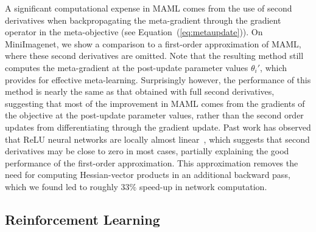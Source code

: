 \documentclass{article}
\begin{document}
A significant computational expense in MAML comes from the use of second derivatives when backpropagating the meta-gradient through the gradient operator in the meta-objective (see Equation~(\ref{eq:metaupdate})). On MiniImagenet, we show a comparison to a first-order approximation of MAML, where these second derivatives are omitted. Note that the resulting method still computes the meta-gradient at the post-update parameter values $\theta_i'$, which provides for effective meta-learning. Surprisingly however, the performance of this method is nearly the same as that obtained with full second derivatives, suggesting that most of the improvement in MAML comes from the gradients of the objective at the post-update parameter values, rather than the second order updates from differentiating through the gradient update. Past work has observed that ReLU neural networks are locally almost linear~\citep{linear}, which suggests that second derivatives may be close to zero in most cases, partially explaining the good performance of the first-order approximation. This approximation removes the need for computing Hessian-vector products in an additional backward pass, which we found led to roughly $33\%$ speed-up in network computation.


\subsection{Reinforcement Learning}
\end{document}
